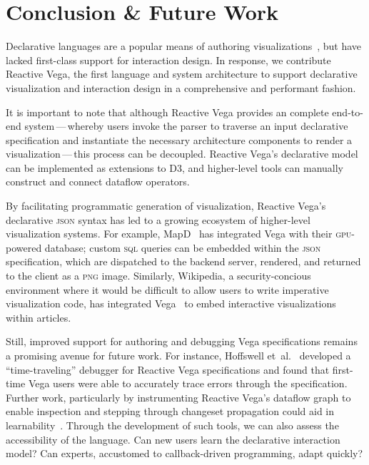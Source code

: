 
\vspace{-20pt}

\section{Conclusion \& Future Work}
\label{sec:vg:conclusion}

\vspace{-10pt}

Declarative languages are a popular means of authoring
visualizations~\cite{bostock:protovis, bostock:d3, heer:protovisjava}, but have
lacked first-class support for interaction design. In response, we contribute
Reactive Vega, the first language and system architecture to support declarative
visualization and interaction design in a comprehensive and performant fashion.

It is important to note that although Reactive Vega provides an complete
end\--to\--end system\,---\,whereby users invoke the parser to traverse an input
declarative specification and instantiate the necessary architecture components
to render a visualization\,---\,this process can be decoupled. Reactive Vega's
declarative model can be implemented as extensions to D3, and higher-level tools
can manually construct and connect dataflow operators.

By facilitating programmatic generation of visualization, Reactive Vega's
declarative \textsc{json} syntax has led to a growing ecosystem of higher-level
visualization systems. For example, MapD~\cite{mapd:vega} has integrated Vega
with their \textsc{gpu}-powered database; custom \textsc{sql} queries can be
embedded within the \textsc{json} specification, which are dispatched to the
backend server, rendered, and returned to the client as a \textsc{png} image.
Similarly, Wikipedia, a security-concious environment where it would be
difficult to allow users to write imperative visualization code, has integrated
Vega~\cite{mediawiki:graph} to embed interactive visualizations within articles.

Still, improved support for authoring and debugging Vega specifications remains
a promising avenue for future work. For instance, Hoffswell
et~al.~\cite{hoffswell:debugging} developed a ``time-traveling'' debugger for
Reactive Vega specifications and found that first-time Vega users were able to
accurately trace errors through the specification. Further work, particularly by
instrumenting Reactive Vega's dataflow graph to enable inspection and stepping
through changeset propagation could aid in learnability~\cite{guo:tutor}.
Through the development of such tools, we can also assess the accessibility of
the language. Can new users learn the declarative interaction model? Can
experts, accustomed to callback-driven programming, adapt quickly?

